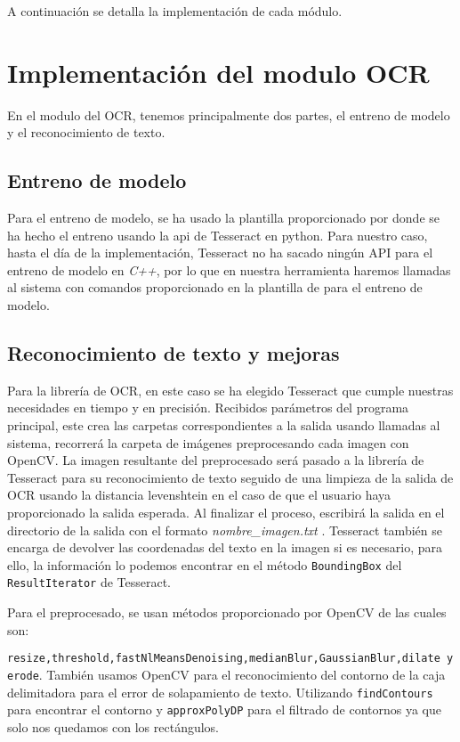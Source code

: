 A continuación se detalla la implementación de cada módulo.
\section{Implementación del modulo OCR}
\label{sec:Implementación del OCR}
En el modulo del OCR, tenemos principalmente dos partes, el entreno de modelo y el reconocimiento de texto.
\subsection{Entreno de modelo}
Para el entreno de modelo, se ha usado la plantilla proporcionado por \cite{Joseda} donde se ha hecho el entreno usando la api de Tesseract en python. Para nuestro caso, hasta el día de la implementación, Tesseract no ha sacado ningún API para el entreno de modelo en \emph{C++}, por lo que en nuestra herramienta haremos llamadas al sistema con comandos proporcionado en la plantilla de \cite{Joseda} para el entreno de modelo.
\subsection{Reconocimiento de texto y mejoras}
Para la librería de OCR, en este caso se ha elegido Tesseract que cumple nuestras necesidades en tiempo y en precisión. Recibidos parámetros del programa principal, este crea las carpetas correspondientes a la salida usando llamadas al sistema, recorrerá la carpeta de imágenes preprocesando cada imagen con OpenCV. La imagen resultante del preprocesado será pasado a la librería de Tesseract para su reconocimiento de texto seguido de una limpieza de la salida de OCR usando la distancia levenshtein en el caso de que el usuario haya proporcionado la salida esperada. Al finalizar el proceso, escribirá la salida en el directorio de la salida con el formato \emph{nombre\_imagen.txt}   .
Tesseract también se encarga de devolver las coordenadas del texto en la imagen si es necesario, para ello, la información lo podemos encontrar en el método \texttt{BoundingBox} del \texttt{ResultIterator} de Tesseract.

Para el preprocesado, se usan métodos proporcionado por OpenCV de las cuales son:

 \texttt{resize,threshold,fastNlMeansDenoising,medianBlur,GaussianBlur,dilate y erode}.
También usamos OpenCV para el reconocimiento del contorno de la caja delimitadora para el error de solapamiento de texto. Utilizando \texttt{findContours} para encontrar el contorno y \texttt{approxPolyDP} para el filtrado de contornos ya que solo nos quedamos con los rectángulos.


